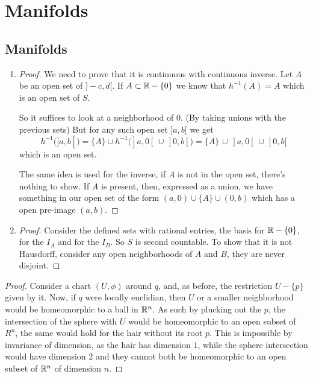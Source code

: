 \chapter{Manifolds}
\section{Manifolds}
\prob

\begin{enumerate}[label=(\alph*)]
	\item
	      \begin{proof}
		      We need to prove that it is continuous with continuous inverse. Let $A$ be an open set of $]-c,d[$.
		      If $A \subset \mathbb{R} - \{0\}$ we know that $h^{-1}(A) = A$ which is an open set of $S$.

		      So it suffices to look at a neighborhood of $0$. (By taking unions with the previous sets)
		      But for any such open set $]a,b[$ we get
		      $$h^{-1}(]a,b[) = \{A\} \cup h^{-1}(]a,0[\, \cup\, ]0,b[) = \{A\}\, \cup\, ]a,0[\, \cup\, ]0,b[$$
		      which is an open set.

		      The same idea is used for the inverse, if $A$ is not in the open set, there's nothing to show. If $A$ is present, then, expressed as a union,
		      we have something in our open set of the form $(a,0) \cup \{A\} \cup (0,b)$ which has a open pre-image
		      $(a,b)$.
	      \end{proof}

	\item \begin{proof}
		      Consider the defined sets with rational entries, the basis for $\mathbb{R} - \{0\}$, for the $I_A$ and for the $I_B$. So
		      $S$ is second countable. To show that it is not Hausdorff, consider any open neighborhoods of $A$ and $B$, they are never disjoint.
	      \end{proof}
\end{enumerate}

\prob
\begin{proof}
	Consider a chart $(U, \phi)$ around $q$, and, as before, the restriction $U - \{p\}$ given by it. Now,
	if $q$ were locally euclidian, then $U$ or a smaller neighborhood would be homeomorphic to a ball in $\mathbb{R}^n$. As such
	by plucking out the $p$, the intersection of the sphere with $U$ would be homeomorphic to an open subset of $R^n$,
	the same would hold for the hair without its root $p$. This is impossible by invariance of dimension, as the hair has dimension $1$, while
	the sphere intersection would have dimension 2 and they cannot both be homeomorphic to an open subset of $\mathbb{R}^n$ of dimension $n$.
\end{proof}

